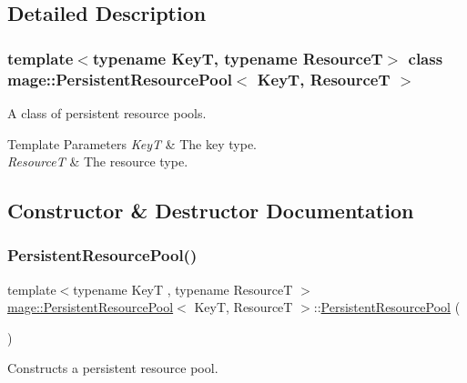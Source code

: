 \subsection{Detailed Description}
\subsubsection*{template$<$typename KeyT, typename ResourceT$>$\newline
class mage\+::\+Persistent\+Resource\+Pool$<$ Key\+T, Resource\+T $>$}

A class of persistent resource pools.


\begin{DoxyTemplParams}{Template Parameters}
{\em KeyT} & The key type. \\
\hline
{\em ResourceT} & The resource type. \\
\hline
\end{DoxyTemplParams}


\subsection{Constructor \& Destructor Documentation}
\hypertarget{classmage_1_1_persistent_resource_pool_a23b83adf594628b93c368a2da7660ef8}{}\label{classmage_1_1_persistent_resource_pool_a23b83adf594628b93c368a2da7660ef8} 
\subsubsection{\texorpdfstring{Persistent\+Resource\+Pool()}{PersistentResourcePool()}\hspace{0.1cm}{\footnotesize\ttfamily [1/3]}}
{\footnotesize\ttfamily template$<$typename KeyT , typename ResourceT $>$ \\
\hyperlink{classmage_1_1_persistent_resource_pool}{mage\+::\+Persistent\+Resource\+Pool}$<$ KeyT, ResourceT $>$\+::\hyperlink{classmage_1_1_persistent_resource_pool}{Persistent\+Resource\+Pool} (\begin{DoxyParamCaption}{ }\end{DoxyParamCaption})\hspace{0.3cm}{\ttfamily [default]}}

Constructs a persistent resource pool. \hypertarget{classmage_1_1_persistent_resource_pool_aca217be62dbc93e4c6241defbfc454ff}{}\label{classmage_1_1_persistent_resource_pool_aca217be62dbc93e4c6241defbfc454ff} 
